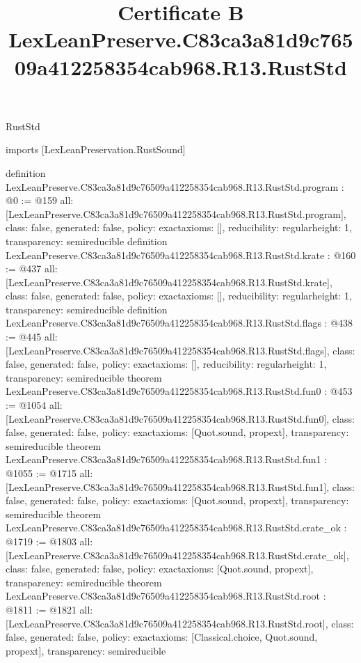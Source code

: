 \begin{lexlean}{RustStd}
\title{Certificate B LexLeanPreserve.C83ca3a81d9c76509a412258354cab968.R13.RustStd}
\begin{coremodule}
imports [LexLeanPreservation.RustSound]

definition LexLeanPreserve.C83ca3a81d9c76509a412258354cab968.R13.RustStd.program : @0 := @159 {
  all: [LexLeanPreserve.C83ca3a81d9c76509a412258354cab968.R13.RustStd.program],
  class: false,
  generated: false,
  policy: exact{axioms: []},
  reducibility: regular{height: 1},
  transparency: semireducible
}
definition LexLeanPreserve.C83ca3a81d9c76509a412258354cab968.R13.RustStd.krate : @160 := @437 {
  all: [LexLeanPreserve.C83ca3a81d9c76509a412258354cab968.R13.RustStd.krate],
  class: false,
  generated: false,
  policy: exact{axioms: []},
  reducibility: regular{height: 1},
  transparency: semireducible
}
definition LexLeanPreserve.C83ca3a81d9c76509a412258354cab968.R13.RustStd.flags : @438 := @445 {
  all: [LexLeanPreserve.C83ca3a81d9c76509a412258354cab968.R13.RustStd.flags],
  class: false,
  generated: false,
  policy: exact{axioms: []},
  reducibility: regular{height: 1},
  transparency: semireducible
}
theorem LexLeanPreserve.C83ca3a81d9c76509a412258354cab968.R13.RustStd.fun0 : @453 := @1054 {
  all: [LexLeanPreserve.C83ca3a81d9c76509a412258354cab968.R13.RustStd.fun0],
  class: false,
  generated: false,
  policy: exact{axioms: [Quot.sound, propext]},
  transparency: semireducible
}
theorem LexLeanPreserve.C83ca3a81d9c76509a412258354cab968.R13.RustStd.fun1 : @1055 := @1715 {
  all: [LexLeanPreserve.C83ca3a81d9c76509a412258354cab968.R13.RustStd.fun1],
  class: false,
  generated: false,
  policy: exact{axioms: [Quot.sound, propext]},
  transparency: semireducible
}
theorem LexLeanPreserve.C83ca3a81d9c76509a412258354cab968.R13.RustStd.crate_ok : @1719 := @1803 {
  all: [LexLeanPreserve.C83ca3a81d9c76509a412258354cab968.R13.RustStd.crate_ok],
  class: false,
  generated: false,
  policy: exact{axioms: [Quot.sound, propext]},
  transparency: semireducible
}
theorem LexLeanPreserve.C83ca3a81d9c76509a412258354cab968.R13.RustStd.root : @1811 := @1821 {
  all: [LexLeanPreserve.C83ca3a81d9c76509a412258354cab968.R13.RustStd.root],
  class: false,
  generated: false,
  policy: exact{axioms: [Classical.choice, Quot.sound, propext]},
  transparency: semireducible
}


\end{coremodule}
\end{lexlean}
